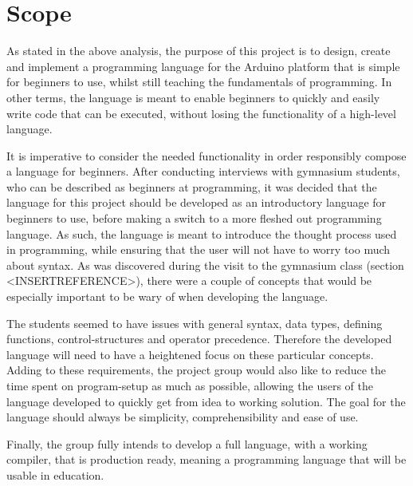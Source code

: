 \section{Scope}
As stated in the above analysis, the purpose of this project is to design, create and implement a
programming language for the Arduino platform that is simple for beginners to use, whilst still teaching the
fundamentals of programming.
In other terms, the language is meant to enable beginners to quickly and easily write
code that can be executed, without losing the functionality of a high-level language.

It is imperative to consider the needed functionality in order responsibly compose a language for
beginners.
After conducting interviews with gymnasium students, who can be described as beginners at programming,
it was decided that the language for this project should be developed as an introductory language for beginners to use, before making a switch to a more fleshed out programming language.
As such, the language is meant to introduce the thought process used in programming, while ensuring that the user will not have to worry too much about syntax.
As was discovered during the visit to the gymnasium class (section <INSERTREFERENCE>), there were a couple of concepts that would be especially important to be wary of when developing the language.

The students seemed to have issues with general syntax, data types, defining functions, control-structures and operator precedence.
Therefore the developed language will need to have a heightened focus on these particular concepts. 
Adding to these requirements, the project group would also like to reduce the time spent on program-setup as much as possible, allowing the users of the language developed to quickly get from idea to working solution.
The goal for the language should always be simplicity, comprehensibility and ease of use.

Finally, the group fully intends to develop a full language, with a working compiler, that is production ready, meaning a programming language that will be usable in education.

